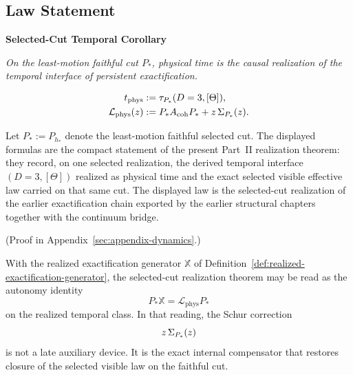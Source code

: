 \subsection{Law Statement}

\begin{tcolorbox}[colback=white, colframe=black!75, boxrule=0.9pt, title={Selected-Cut Realization of Exactification}]
\begin{center}
{\large\bfseries Selected-Cut Temporal Corollary}

\medskip
\emph{On the least-motion faithful cut \(P_\ast\), physical time is the
causal realization of the temporal interface of persistent exactification.}

\medskip
\[
\begin{aligned}
t_{\mathrm{phys}}
&:= \tau_{P_\ast}(D=3,[\Theta]),\\
\mathcal L_{\mathrm{phys}}(z)
&:= P_\ast A_{\mathrm{coh}} P_\ast + z\,\Sigma_{P_\ast}(z).
\end{aligned}
\]
\end{center}
\end{tcolorbox}

\begin{proposition}
\label{prop:temporal-realization-law-identity}
Let \(P_\ast := P_{h_\ast}\) denote the least-motion faithful selected cut. The
displayed formulas are the compact statement of the present Part~II
realization theorem: they record, on one selected realization, the derived temporal
interface \((D=3,[\Theta])\) realized as physical time and the exact selected
visible effective law carried on that same cut. The displayed law is the
selected-cut realization of the earlier exactification chain exported by the
earlier structural chapters together with the continuum bridge.
\end{proposition}

(Proof in Appendix~\ref{sec:appendix-dynamics}.)

\begin{remark}
\label{rem:selected-cut-autonomy-identity}
With the realized exactification generator \(\mathbb X\) of
Definition~\ref{def:realized-exactification-generator}, the selected-cut
realization theorem may be read as the autonomy identity
\[
P_\ast \mathbb X = \mathcal L_{\mathrm{phys}} P_\ast
\]
on the realized temporal class. In that reading, the Schur correction
\[
z\,\Sigma_{P_\ast}(z)
\]
is not a late auxiliary device. It is the exact internal compensator that
restores closure of the selected visible law on the faithful cut.
\end{remark}

